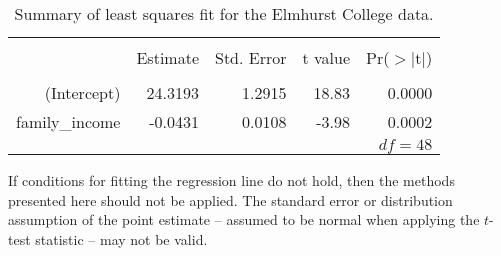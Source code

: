 \begin{table}[ht]
\centering
\begin{tabular}{rrrrr}
  \hline
  \vspace{-3.7mm} & & & & \\
 & Estimate & Std. Error & t value & Pr($>$$|$t$|$) \\ 
  \hline
  \vspace{-3.6mm} & & & & \\
(Intercept) & 24.3193 & 1.2915 & 18.83 & 0.0000 \\ 
family\_\hspace{0.3mm}income & -0.0431 & 0.0108 & -3.98 & 0.0002 \\ 
   \hline
   \multicolumn{5}{r}{$df=48$} \\
\end{tabular}
\caption{Summary of least squares fit for the Elmhurst College data.}
\label{rOutputForIncomeAidLSRLineInInferenceSection}
\end{table}

\begin{tipBox}{
If conditions for fitting the regression line do not hold, then the methods presented here should not be applied. The standard error or distribution assumption of the point estimate -- assumed to be normal when applying the $t$-test statistic -- may not be valid.}
\end{tipBox}



